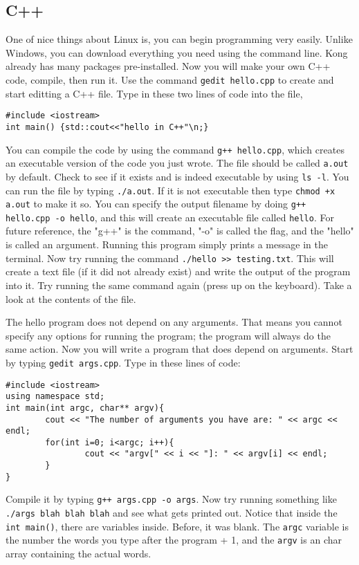 \documentclass{article}
\begin{document}
\subsection{C++}
One of nice things about Linux is, you can begin programming very easily. Unlike Windows, you can download everything you need using the command line. Kong already has many packages pre-installed. Now you will make your own C++ code, compile, then run it. Use the command \texttt{gedit hello.cpp} to create and start editting a C++ file. Type in these two lines of code into the file,
\begin{verbatim}
#include <iostream>
int main() {std::cout<<"hello in C++"\n;}
\end{verbatim}
You can compile the code by using the command \texttt{g++ hello.cpp}, which creates an executable version of the code you just wrote. The file should be called \texttt{a.out} by default. Check to see if it exists and is indeed executable by using \texttt{ls -l}. You can run the file by typing \texttt{./a.out}. If it is not executable then type \texttt{chmod +x a.out} to make it so. You can specify the output filename by doing \texttt{g++ hello.cpp -o hello}, and this will create an executable file called \texttt{hello}. For future reference, the "g++" is the command, "-o" is called the flag, and the "hello" is called an argument. Running this program simply prints a message in the terminal. Now try running the command \texttt{./hello >> testing.txt}. This will create a text file (if it did not already exist) and write the output of the program into it. Try running the same command again (press up on the keyboard). Take a look at the contents of the file.

The hello program does not depend on any arguments. That means you cannot specify any options for running the program; the program will always do the same action. Now you will write a program that does depend on arguments. Start by typing \texttt{gedit args.cpp}. Type in these lines of code:
\begin{verbatim}
#include <iostream>
using namespace std;
int main(int argc, char** argv){
        cout << "The number of arguments you have are: " << argc << endl;
        for(int i=0; i<argc; i++){
                cout << "argv[" << i << "]: " << argv[i] << endl;
        }
}
\end{verbatim}
Compile it by typing \texttt{g++ args.cpp -o args}. Now try running something like \texttt{./args blah blah blah} and see what gets printed out. Notice that inside the \texttt{int main()}, there are variables inside. Before, it was blank. The \texttt{argc} variable is the number the words you type after the program + 1, and the \texttt{argv} is an char array containing the actual words.
\end{document}
